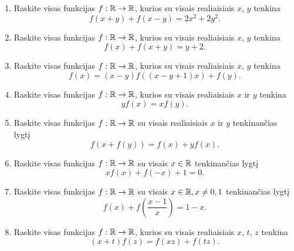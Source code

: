 \begin{enumerate}
  \item Raskite visas funkcijas $f:\mathbb R\to\mathbb R$, kurios su
    visais realiaisiais $x$, $y$ tenkina $$f(x+y)+f(x-y)=2x^2+2y^2.$$
  \item Raskite visas funkcijas $f:\mathbb R\to\mathbb R$, kurios su visais realiaisiais
    $x$, $y$ tenkina $$f(x)+f(x+y)=y+2.$$
  \item Raskite visas funkcijas $f:\mathbb R\to\mathbb R$, kurios su visais realiaisiais
    $x$, $y$ tenkina $$f(x)=(x-y)f((x-y+1)x) + f(y).$$
  \item Raskite visas funkcijas $f:\mathbb R\to\mathbb R$, kurios su visais realiaisiais
    $x$ ir $y$ tenkina $$yf(x) = xf(y).$$
  \item Raskite visas funkcijas $f:\mathbb R\to\mathbb R$ su visais realiaisiais
    $x$ ir $y$ tenkinančias lygtį $$f(x +f(y)) = f(x) + yf(x).$$
  \item Raskite visas funkcijas $f:\mathbb R\to\mathbb R$ su visais $x\in \mathbb R$ tenkinančias
    lygtį $$xf(x) + f(-x) + 1 = 0.$$
  \item Raskite visas funkcijas $f:\mathbb R\to\mathbb R$ su visais $x\in\mathbb R, x\neq 0,1$
    tenkinančias lygtį $$f(x) + f(\frac{x-1}{x})= 1-x.$$
  \item Raskite visas funkcijas $f:\mathbb R\to\mathbb R$, kurios su visais realiaisiais
    $x$, $t$, $z$ tenkina $$(x+t)f(z) = f(xz) + f(tz).$$

\end{enumerate}
